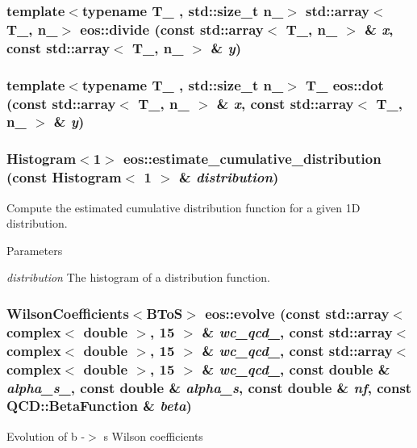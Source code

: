 \label{namespaceeos_a7fb80dc36d6e29adfbde318a197ea591}
\hypertarget{namespaceeos_a8031207b4e14e35ca72988b76bfaacf1}{
\subsubsection[{divide}]{\setlength{\rightskip}{0pt plus 5cm}template$<$typename T\_\- , std::size\_\-t n\_\-$>$ std::array$<$T\_\-, n\_\-$>$ eos::divide (const std::array$<$ T\_\-, n\_\- $>$ \& {\em x}, \/  const std::array$<$ T\_\-, n\_\- $>$ \& {\em y})}}
\label{namespaceeos_a8031207b4e14e35ca72988b76bfaacf1}
\hypertarget{namespaceeos_ac3181f83f30b4811151158ffc68a5396}{
\subsubsection[{dot}]{\setlength{\rightskip}{0pt plus 5cm}template$<$typename T\_\- , std::size\_\-t n\_\-$>$ T\_\- eos::dot (const std::array$<$ T\_\-, n\_\- $>$ \& {\em x}, \/  const std::array$<$ T\_\-, n\_\- $>$ \& {\em y})}}
\label{namespaceeos_ac3181f83f30b4811151158ffc68a5396}
\hypertarget{namespaceeos_a163f4d3cb33f72cf2ffc42f8cee7db0e}{
\subsubsection[{estimate\_\-cumulative\_\-distribution}]{\setlength{\rightskip}{0pt plus 5cm}Histogram$<$1$>$ eos::estimate\_\-cumulative\_\-distribution (const Histogram$<$ 1 $>$ \& {\em distribution})}}
\label{namespaceeos_a163f4d3cb33f72cf2ffc42f8cee7db0e}
Compute the estimated cumulative distribution function for a given 1D distribution.


\begin{DoxyParams}{Parameters}
\item[{\em distribution}]The histogram of a distribution function. \end{DoxyParams}
\hypertarget{namespaceeos_a07bd8aab4adc1e31cfbd795b36f592ee}{
\subsubsection[{evolve}]{\setlength{\rightskip}{0pt plus 5cm}WilsonCoefficients$<${\bf BToS}$>$ eos::evolve (const std::array$<$ complex$<$ double $>$, 15 $>$ \& {\em wc\_\-qcd\_}, \/  const std::array$<$ complex$<$ double $>$, 15 $>$ \& {\em wc\_\-qcd\_}, \/  const std::array$<$ complex$<$ double $>$, 15 $>$ \& {\em wc\_\-qcd\_}, \/  const double \& {\em alpha\_\-s\_}, \/  const double \& {\em alpha\_\-s}, \/  const double \& {\em nf}, \/  const QCD::BetaFunction \& {\em beta})}}
\label{namespaceeos_a07bd8aab4adc1e31cfbd795b36f592ee}
Evolution of b -\/$>$ s Wilson coefficients

